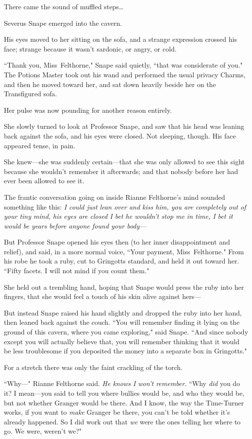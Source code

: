 There came the sound of muffled steps{\ldots}

Severus Snape emerged into the cavern.

His eyes moved to her sitting on the sofa, and a strange expression crossed his face; strange because it wasn't sardonic, or angry, or cold.

``Thank you, Miss~Felthorne," Snape said quietly, ``that was considerate of you." The Potions Master took out his wand and performed the usual privacy Charms, and then he moved toward her, and sat down heavily beside her on the Transfigured sofa.

Her pulse was now pounding for another reason entirely.

She slowly turned to look at Professor Snape, and saw that his head was leaning back against the sofa, and his eyes were closed. Not sleeping, though. His face appeared tense, in pain.

She knew---she was suddenly certain---that she was only allowed to see this sight because she wouldn't remember it afterwards; and that nobody before her had ever been allowed to see it.

The frantic conversation going on inside Rianne Felthorne's mind sounded something like this: \emph{I could just lean over and kiss him, you are completely out of your tiny mind, his eyes are closed I bet he wouldn't stop me in time, I bet it would be years before anyone found your body---}

But Professor Snape opened his eyes then (to her inner disappointment and relief), and said, in a more normal voice, ``Your payment, Miss~Felthorne." From his robe he took a ruby, cut to Gringotts standard, and held it out toward her. ``Fifty facets. I will not mind if you count them."

She held out a trembling hand, hoping that Snape would press the ruby into her fingers, that she would feel a touch of his skin alive against hers---

But instead Snape raised his hand slightly and dropped the ruby into her hand, then leaned back against the couch. ``You will remember finding it lying on the ground of this cavern, where you came exploring," said Snape. ``And since nobody except you will actually believe that, you will remember thinking that it would be less troublesome if you deposited the money into a separate box in Gringotts."

For a stretch there was only the faint crackling of the torch.

``Why---" Rianne Felthorne said. \emph{He knows I won't remember.} ``Why \emph{did} you do it? I mean---you said to tell you where bullies would be, and who they would be, but not whether Granger would be there. And I know, the way the Time-Turner works, if you want to \emph{make} Granger be there, you can't be told whether it's already happened. So I did work out that \emph{we} were the ones telling her where to go. We were, weren't we?"

